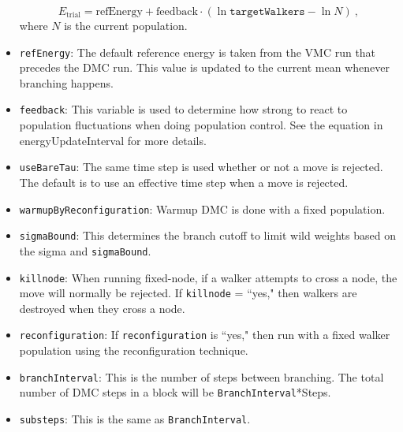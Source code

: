 \begin{itemize}
\[
E_{\text{trial}}=
\textrm{refEnergy}+\textrm{feedback}\cdot(\ln\texttt{targetWalkers}-\ln N)\:,
\]
where $N$ is the current population.

\item \texttt{refEnergy}: The default reference energy is taken from the VMC run that precedes the DMC run. This value is updated to the current mean whenever branching happens.

\item \texttt{feedback}: This variable is used to determine how strong to react to population fluctuations when doing population control.  See the equation in energyUpdateInterval for more details.

\item \texttt{useBareTau}: The same time step is used whether or not a move is rejected. The default is to use an effective time step when a move is rejected.

\item \texttt{warmupByReconfiguration}:  Warmup DMC is done with a fixed population.

\item \texttt{sigmaBound}:  This determines the branch cutoff to limit wild weights based on the sigma and \texttt{sigmaBound}.

\item \texttt{killnode}:  When running fixed-node, if a walker attempts to cross a node, the move will normally be rejected.  If \texttt{killnode} = ``yes," then walkers are destroyed when they cross a node.


\item \texttt{reconfiguration}:  If \texttt{reconfiguration} is ``yes," then run with a fixed walker population using the reconfiguration technique.  

\item \texttt{branchInterval}: This is the number of steps between branching.  The total number of DMC steps in a block will be \texttt{BranchInterval}*Steps.   

\item \texttt{substeps}:  This is the same as \texttt{BranchInterval}.



\end{itemize}
